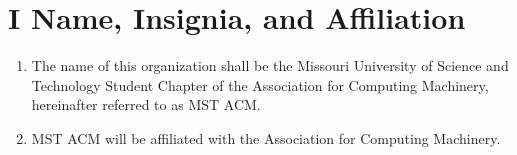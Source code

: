 \section{I \textendash{} Name, Insignia, and Affiliation}
\begin{enumerate}[label=\Alph*.]
  \item The name of this organization shall be the Missouri University of
  Science and Technology Student Chapter of the Association for Computing
  Machinery, hereinafter referred to as MST ACM.
  \item MST ACM will be affiliated with the Association for Computing Machinery.
\end{enumerate}
